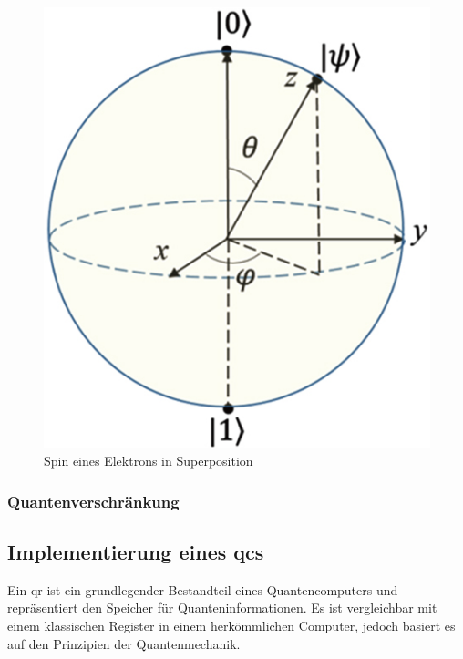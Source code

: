 \begin{figure}[!hbt]
    \centering
    \includegraphics{./images/spin-superpostition.jpg}
    \caption{Spin eines Elektrons in Superposition \cite{noauthor_cpb_27_9_090308_f8jpg_nodate}}
    \label{fig:spin}
\end{figure}

\subsubsection{Quantenverschränkung}


\subsection{Implementierung eines \ac{qc}s}



Ein \ac{qr} ist ein grundlegender Bestandteil eines Quantencomputers und repräsentiert den Speicher für Quanteninformationen. Es ist vergleichbar mit einem klassischen Register in einem herkömmlichen Computer, jedoch basiert es auf den Prinzipien der Quantenmechanik.

